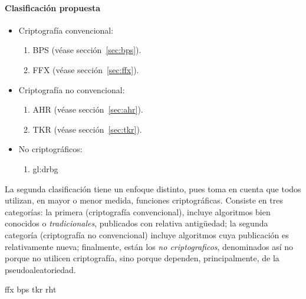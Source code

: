 \paragraph{Clasificación propuesta}
\begin{itemize}
  \item Criptografía convencional:
    \begin{enumerate}
      \item BPS (véase sección~\ref{sec:bps}).
      \item FFX (véase sección~\ref{sec:ffx}).
    \end{enumerate}
  \item Criptografía no convencional:
    \begin{enumerate}
      \item AHR (véase sección~\ref{sec:ahr}).
      \item TKR (véase sección~\ref{sec:tkr}).
    \end{enumerate}
  \item No criptográficos:
    \begin{enumerate}
      \item \gls{gl:drbg}
    \end{enumerate}
\end{itemize}

La segunda clasificación tiene un enfoque distinto, pues toma en cuenta que todos
utilizan, en mayor o menor medida, funciones criptográficas. Consiste en tres
categorías: la primera (criptografía convencional), incluye algoritmos bien
conocidos o \textit{tradicionales}, publicados con relativa antigüedad;
la segunda categoría (criptografía no convencional) incluye algoritmos cuya
publicación es relativamente nueva; finalmente, están los
\textit{no criptograficos}, denominados así no porque no utilicen criptografía,
sino porque dependen, principalmente, de la pseudoaleatoriedad.

{ffx}
{bps}
{tkr}
{rht}
